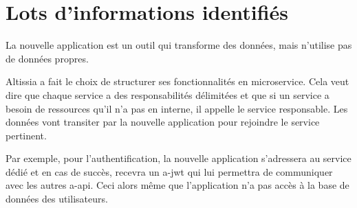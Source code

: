 \section{Lots d'informations identifiés}
\label{sec:identified-information-packages}
La nouvelle application est un outil qui transforme des données, mais n'utilise pas de données propres.

Altissia a fait le choix de structurer ses fonctionnalités en microservice.
Cela veut dire que chaque service a des responsabilités délimitées et que si un service a besoin de ressources qu'il n'a pas en interne, il appelle le service responsable.
Les données vont transiter par la nouvelle application pour rejoindre le service pertinent.

Par exemple, pour l'authentification, la nouvelle application s'adressera au service dédié et en cas de succès, recevra un \gls{a-jwt} qui lui permettra de communiquer avec les autres \gls{a-api}.
Ceci alors même que l'application n'a pas accès à la base de données des utilisateurs.

